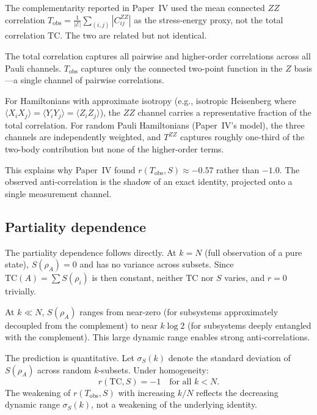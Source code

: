 \documentclass[aps,pra,twocolumn,superscriptaddress,floatfix]{revtex4-2}
\begin{document}
The complementarity reported in Paper~IV used the
mean connected $ZZ$ correlation
$T_\mathrm{obs} = \frac{1}{|\mathcal{E}|}
\sum_{(i,j)} |C_{ij}^{ZZ}|$
as the stress-energy proxy, not the total
correlation $\mathrm{TC}$.  The two are related but not
identical.

The total correlation captures all pairwise and
higher-order correlations across all Pauli channels.
$T_\mathrm{obs}$ captures only the connected two-point
function in the $Z$ basis---a single channel of
pairwise correlations.

For Hamiltonians with approximate isotropy
(e.g., isotropic Heisenberg where
$\langle X_iX_j \rangle = \langle Y_iY_j \rangle = \langle Z_iZ_j \rangle$),
the $ZZ$ channel carries a representative
fraction of the total correlation.  For random Pauli
Hamiltonians (Paper~IV's model), the three channels
are independently weighted, and $T^{ZZ}$ captures
roughly one-third of the two-body contribution
but none of the higher-order terms.

This explains why Paper~IV found $r(T_\mathrm{obs}, S) \approx -0.57$
rather than $-1.0$.  The observed anti-correlation
is the shadow of an exact identity, projected onto
a single measurement channel.

\subsection{Partiality dependence}

The partiality dependence follows directly.
At $k = N$ (full observation of a pure state),
$S(\rho_A) = 0$ and has no variance across subsets.
Since $\mathrm{TC}(A) = \sum S(\rho_i)$ is then
constant, neither $\mathrm{TC}$ nor $S$ varies,
and $r = 0$ trivially.

At $k \ll N$, $S(\rho_A)$ ranges from near-zero
(for subsystems approximately decoupled from
the complement) to near $k \log 2$ (for subsystems
deeply entangled with the complement).
This large dynamic range enables strong anti-correlations.

The prediction is quantitative.  Let $\sigma_S(k)$
denote the standard deviation of $S(\rho_A)$ across
random $k$-subsets.  Under homogeneity:
\begin{equation}
r(\mathrm{TC}, S) = -1
\quad \text{for all } k < N.
\end{equation}
The weakening of $r(T_\mathrm{obs}, S)$ with
increasing $k/N$ reflects the decreasing
dynamic range $\sigma_S(k)$, not a weakening
of the underlying identity.
\end{document}
